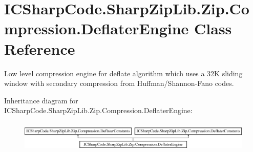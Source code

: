 \hypertarget{class_i_c_sharp_code_1_1_sharp_zip_lib_1_1_zip_1_1_compression_1_1_deflater_engine}{}\section{I\+C\+Sharp\+Code.\+Sharp\+Zip\+Lib.\+Zip.\+Compression.\+Deflater\+Engine Class Reference}
\label{class_i_c_sharp_code_1_1_sharp_zip_lib_1_1_zip_1_1_compression_1_1_deflater_engine}


Low level compression engine for deflate algorithm which uses a 32K sliding window with secondary compression from Huffman/\+Shannon-\/\+Fano codes.  


Inheritance diagram for I\+C\+Sharp\+Code.\+Sharp\+Zip\+Lib.\+Zip.\+Compression.\+Deflater\+Engine\+:\begin{figure}[H]
\begin{center}
\leavevmode
\includegraphics[height=1.497326cm]{class_i_c_sharp_code_1_1_sharp_zip_lib_1_1_zip_1_1_compression_1_1_deflater_engine}
\end{center}
\end{figure}
